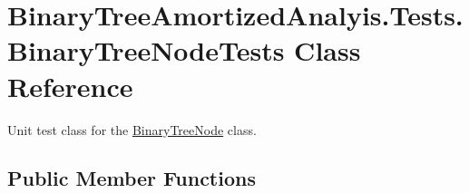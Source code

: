 \hypertarget{class_binary_tree_amortized_analyis_1_1_tests_1_1_binary_tree_node_tests}{}\section{Binary\+Tree\+Amortized\+Analyis.\+Tests.\+Binary\+Tree\+Node\+Tests Class Reference}
\label{class_binary_tree_amortized_analyis_1_1_tests_1_1_binary_tree_node_tests}


Unit test class for the \hyperlink{class_binary_tree_amortized_analyis_1_1_binary_tree_node}{Binary\+Tree\+Node} class.  


\subsection*{Public Member Functions}
